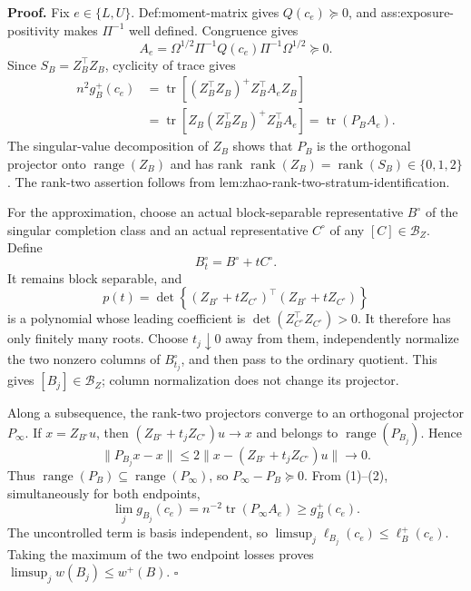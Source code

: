 \textbf{Proof.}
Fix \(e\in\{L,U\}\).  Def:moment-matrix gives \(Q(c_e)\succeq0\), and ass:exposure-positivity makes \(\Pi^{-1}\) well defined.  Congruence gives
\[
A_e=\Omega^{1/2}\Pi^{-1}Q(c_e)\Pi^{-1}\Omega^{1/2}\succeq0. \tag{1}
\]
Since \(S_B=Z_B^{\top}Z_B\), cyclicity of trace gives
\[
\begin{aligned}
n^2g_B^+(c_e)
&=\operatorname{tr}\!\left[(Z_B^{\top}Z_B)^+Z_B^{\top}A_eZ_B\right]\\
&=\operatorname{tr}\!\left[Z_B(Z_B^{\top}Z_B)^+Z_B^{\top}A_e\right]
=\operatorname{tr}(P_BA_e).
\end{aligned} \tag{2}
\]
The singular-value decomposition of \(Z_B\) shows that \(P_B\) is the orthogonal projector onto \(\operatorname{range}(Z_B)\) and has rank \(\operatorname{rank}(Z_B)=\operatorname{rank}(S_B)\in\{0,1,2\}\).  The rank-two assertion follows from lem:zhao-rank-two-stratum-identification.

For the approximation, choose an actual block-separable representative \(B^\circ\) of the singular completion class and an actual representative \(C^\circ\) of any \([C]\in\mathcal B_Z\).  Define
\[
B_t^\circ=B^\circ+tC^\circ.
\]
It remains block separable, and
\[
p(t)=\det\!\left\{(Z_{B^\circ}+tZ_{C^\circ})^{\top}(Z_{B^\circ}+tZ_{C^\circ})\right\}
\]
is a polynomial whose leading coefficient is \(\det(Z_{C^\circ}^{\top}Z_{C^\circ})>0\).  It therefore has only finitely many roots.  Choose \(t_j\downarrow0\) away from them, independently normalize the two nonzero columns of \(B_{t_j}^\circ\), and then pass to the ordinary quotient.  This gives \([B_j]\in\mathcal B_Z\); column normalization does not change its projector.

Along a subsequence, the rank-two projectors converge to an orthogonal projector \(P_\infty\).  If \(x=Z_{B^\circ}u\), then \((Z_{B^\circ}+t_jZ_{C^\circ})u\to x\) and belongs to \(\operatorname{range}(P_{B_j})\).  Hence
\[
\lVert P_{B_j}x-x\rVert
\le2\lVert x-(Z_{B^\circ}+t_jZ_{C^\circ})u\rVert\longrightarrow0.
\]
Thus \(\operatorname{range}(P_B)\subseteq\operatorname{range}(P_\infty)\), so \(P_\infty-P_B\succeq0\).  From (1)--(2), simultaneously for both endpoints,
\[
\lim_jg_{B_j}(c_e)=n^{-2}\operatorname{tr}(P_\infty A_e)
\ge g_B^+(c_e).
\]
The uncontrolled term is basis independent, so \(\limsup_j\ell_{B_j}(c_e)\le\ell_B^+(c_e)\).  Taking the maximum of the two endpoint losses proves \(\limsup_jw(B_j)\le w^+(B)\). \(\square\)